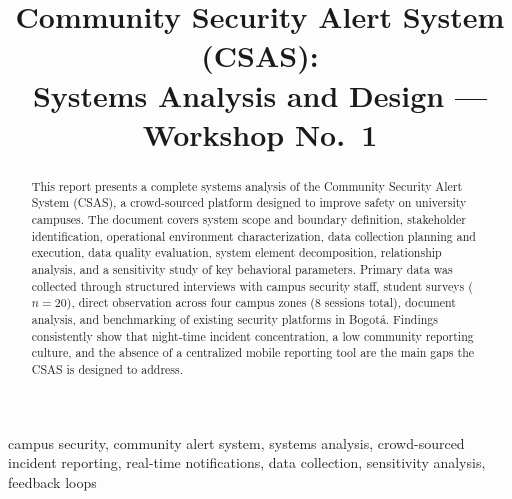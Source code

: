 \documentclass[12pt, onecolumn]{IEEEtran}
\begin{document}
\title{Community Security Alert System (CSAS):\\
       Systems Analysis and Design --- Workshop No.~1}

\author{
}

\maketitle

\begin{abstract}
This report presents a complete systems analysis of the Community
Security Alert System (CSAS), a crowd-sourced platform designed to
improve safety on university campuses. The document covers system scope
and boundary definition, stakeholder identification, operational
environment characterization, data collection planning and execution,
data quality evaluation, system element decomposition, relationship
analysis, and a sensitivity study of key behavioral parameters. Primary
data was collected through structured interviews with campus security
staff, student surveys ($n=20$), direct observation across four campus
zones (8 sessions total), document analysis, and benchmarking of
existing security platforms in Bogot\'{a}. Findings consistently show
that night-time incident concentration, a low community reporting
culture, and the absence of a centralized mobile reporting tool are the
main gaps the CSAS is designed to address.
\end{abstract}

\begin{IEEEkeywords}
campus security, community alert system, systems analysis,
crowd-sourced incident reporting, real-time notifications,
data collection, sensitivity analysis, feedback loops
\end{IEEEkeywords}

\end{document}
